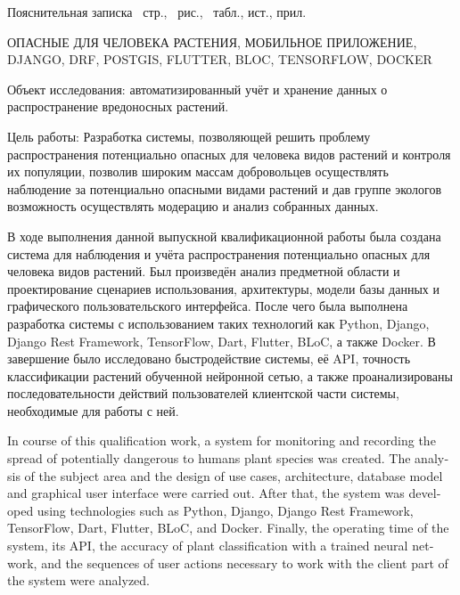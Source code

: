 

\tab
Пояснительная записка \pagescount\ стр., \ рис., \ табл.,  ист.,  прил.

\tab
\MakeUppercase{Опасные для человека растения, Мобильное приложение, Django, DRF, PostGIS, Flutter, BLoC, TensorFlow, Docker}

\tab
Объект исследования: автоматизированный учёт и хранение данных о распространение вредоносных растений.

\tab
Цель работы: Разработка системы, позволяющей решить проблему распространения потенциально опасных для человека видов растений и контроля их популяции, позволив широким массам добровольцев осуществлять наблюдение за потенциально опасными видами растений и дав группе экологов возможность осуществлять модерацию и анализ собранных данных.

\tab
В ходе выполнения данной выпускной квалификационной работы была создана система для наблюдения и учёта распространения потенциально опасных для человека видов растений.
Был произведён анализ предметной области и проектирование сценариев использования, архитектуры, модели базы данных и графического пользовательского интерфейса.
После чего была выполнена разработка системы с использованием таких технологий как Python, Django, Django Rest Framework, TensorFlow, Dart, Flutter, BLoC, а также Docker.
В завершение было исследовано быстродействие системы, её API, точность классификации растений обученной нейронной сетью, а также проанализированы последовательности действий пользователей клиентской части системы, необходимые для работы с ней.

\cleardoublepage
{}

\tab
\begin{otherlanguage}{english}
	In course of this qualification work, a system for monitoring and recording the spread of potentially dangerous to humans plant species was created.
	The analysis of the subject area and the design of use cases, architecture, database model and graphical user interface were carried out.
	After that, the system was developed using technologies such as Python, Django, Django Rest Framework, TensorFlow, Dart, Flutter, BLoC, and Docker.
	Finally, the operating time of the system, its API, the accuracy of plant classification with a trained neural network, and the sequences of user actions necessary to work with the client part of the system were analyzed.
\end{otherlanguage}
